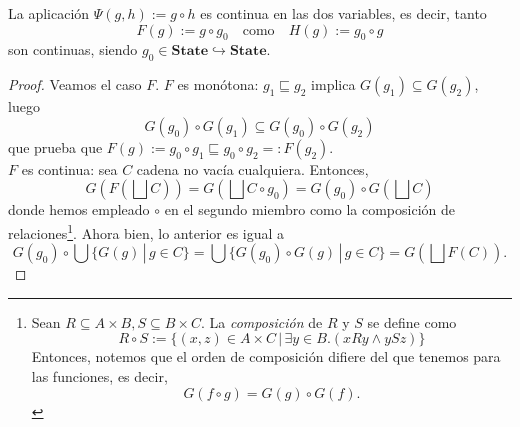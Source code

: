 \begin{lema}
La aplicación $\Psi(g, h) := g \circ h$ es continua en las dos variables, es decir, tanto
$$F(g) := g \circ g_0\quad \text{como}\quad H(g) := g_0 \circ g$$
son continuas, siendo $g_0 \in \mathbf{State}\hookrightarrow\mathbf{State}$.
\end{lema}
\begin{proof}
Veamos el caso $F$. $F$ es monótona: $g_1 \sqsubseteq g_2$ implica $G(g_1)\subseteq G(g_2)$, luego
$$G(g_0)\circ G(g_1) \subseteq G(g_0)\circ G(g_2)$$
que prueba que $F(g):=g_0\circ g_1\sqsubseteq g_0\circ g_2 =: F(g_2)$.
\\
$F$ es continua: sea $C$ cadena no vacía cualquiera. Entonces, 
$$G\left(F\left(\bigsqcup C\right)\right) = G\left(\bigsqcup C \circ g_0\right) = G(g_0)\circ G\left(\bigsqcup C\right)$$
donde hemos empleado $\circ$ en el segundo miembro como la composición de relaciones\footnote{Sean $R \subseteq A \times B, S \subseteq B \times C$. La \textit{composición} de $R$ y $S$ se define como
$$R \circ S := \{(x, z) \in A \times C \, | \, \exists y \in B.(xRy \land ySz)\}$$
Entonces, notemos que el orden de composición difiere del que tenemos para las funciones, es decir, $$G(f \circ g) = G(g) \circ G(f).$$}.
Ahora bien, lo anterior es igual a
$$G(g_0)\circ \bigcup \{G(g) \, | \, g \in C\} = \bigcup \{G(g_0)\circ G(g) \, | \, g \in C\} = G\left(\bigsqcup F(C)\right).$$
\end{proof}


